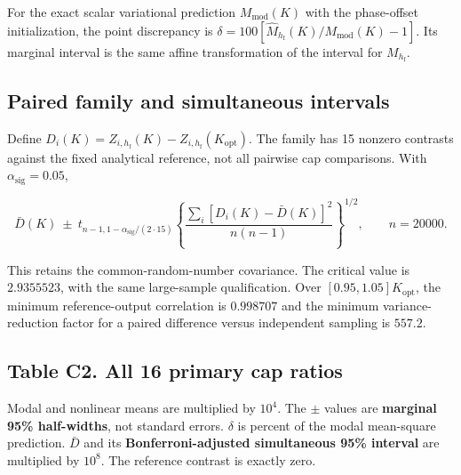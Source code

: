 \documentclass[11pt,a4paper]{article}
\begin{document}
For the exact scalar variational prediction \(M_{\mathrm{mod}}(K)\) with
the phase-offset initialization, the point discrepancy is
\(\delta=100[\widehat M_{h_{\mathrm{f}}}(K)/M_{\mathrm{mod}}(K)-1]\).
Its marginal interval is the same affine transformation of the interval
for \(M_{h_{\mathrm{f}}}\).

\subsection{Paired family and simultaneous intervals}\label{c06-paired}

Define
\(D_i(K)=Z_{i,h_{\mathrm{f}}}(K)-Z_{i,h_{\mathrm{f}}}(K_{\mathrm{opt}})\).
The family has 15 nonzero contrasts against the fixed analytical
reference, not all pairwise cap comparisons. With
\(\alpha_{\mathrm{sig}}=0.05\),

\[
\bar D(K)\ \pm\ t_{n-1,1-\alpha_{\mathrm{sig}}/(2\cdot15)}
\left\{\frac{\sum_i[D_i(K)-\bar D(K)]^2}{n(n-1)}\right\}^{1/2},
\qquad n=20000. \tag{E08}
\]

This retains the common-random-number covariance. The critical value is
\(2.9355523\), with the same large-sample qualification. Over
\([0.95,1.05]K_{\mathrm{opt}}\), the minimum reference-output
correlation is \(0.998707\) and the minimum variance-reduction factor
for a paired difference versus independent sampling is \(557.2\).

\subsection{Table C2. All 16 primary cap ratios}\label{table-c2}

Modal and nonlinear means are multiplied by \(10^4\). The \(\pm\) values
are \textbf{marginal 95\% half-widths}, not standard errors. \(\delta\)
is percent of the modal mean-square prediction. \(\bar D\) and its
\textbf{Bonferroni-adjusted simultaneous 95\% interval} are multiplied
by \(10^8\). The reference contrast is exactly zero.
\end{document}
